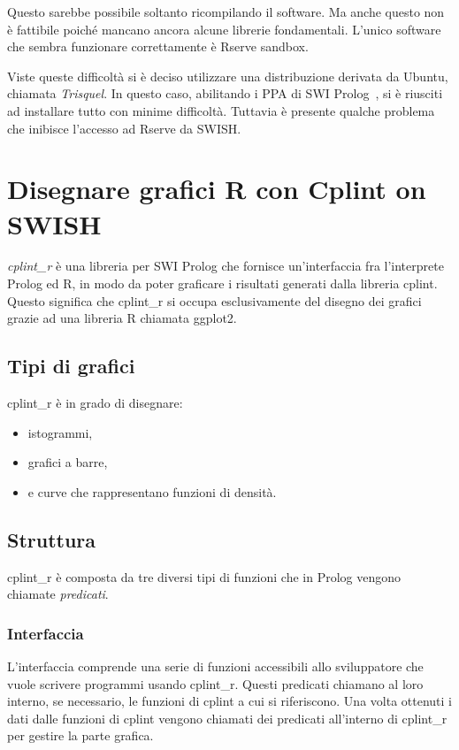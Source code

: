 \documentclass[10pt,titlepage,twoside,a4paper]{report}
\begin{document}
Questo sarebbe possibile soltanto ricompilando il software. Ma anche questo 
non è fattibile poiché mancano ancora alcune librerie fondamentali. L'unico 
software che sembra funzionare correttamente è Rserve sandbox.

Viste queste difficoltà si è deciso utilizzare una distribuzione derivata 
da Ubuntu, chiamata \emph{Trisquel}. In questo caso, abilitando i PPA di SWI 
Prolog~\cite{SWIPrologPPA}, si è riusciti ad installare tutto con minime 
difficoltà. Tuttavia è presente qualche problema che inibisce l'accesso ad 
Rserve da SWISH.




\chapter{Disegnare grafici R con Cplint on SWISH} 
\label{disegnare-grafici-r-con-cplint-on-swish}
\emph{cplint\_r} è una libreria per SWI Prolog che fornisce un'interfaccia 
fra l'interprete Prolog ed R, in modo da poter graficare i risultati generati 
dalla libreria cplint. Questo significa che cplint\_r si occupa esclusivamente 
del disegno dei grafici grazie ad una libreria R chiamata ggplot2.

\section{Tipi di grafici}
cplint\_r è in grado di disegnare:
\begin{itemize}
    \item istogrammi,
    \item grafici a barre,
    \item e curve che rappresentano funzioni di densità.
\end{itemize}

\section{Struttura}
cplint\_r è composta da tre diversi tipi di funzioni che in Prolog vengono 
chiamate \emph{predicati}.

\subsection{Interfaccia}
L'interfaccia comprende una serie di funzioni accessibili allo sviluppatore che 
vuole scrivere programmi usando cplint\_r. Questi predicati chiamano al loro 
interno, se necessario, le funzioni di cplint a cui si riferiscono. Una volta 
ottenuti i dati dalle funzioni di cplint vengono chiamati dei predicati 
all'interno di cplint\_r per gestire la parte grafica.
\end{document}
